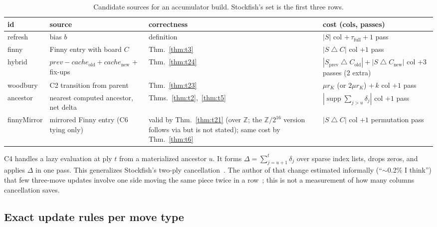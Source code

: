 \documentclass[10pt]{article}
\newcommand{\lnm}[1]{\lean{VNNUE.#1}}
\newcommand{\Z}{\mathbb{Z}}
\newcommand{\Zm}[1]{\Z/2^{#1}}
\DeclareMathOperator{\supp}{supp}
\newcommand{\symd}{\mathbin{\triangle}}
\theoremstyle{plain}
\theoremstyle{definition}
\begin{document}
\begin{table}[htbp]
\centering\small
\caption{Candidate sources for an accumulator build. Stockfish's set is the first three rows.}\label{tab:sources}
\begin{tabularx}{\linewidth}{@{}l>{\raggedright}X>{\raggedright}p{2.3cm}>{\raggedright\arraybackslash}X@{}}
\toprule
id & source & correctness & cost (cols, passes)\\
\midrule
refresh & bias $b$ & definition & $|S|$ col $+\,\tau_{\text{full}}+1$ pass\\
finny & Finny entry with board $C$ & Thm.~\ref{thm:t3} & $|S\symd C|$ col $+1$ pass\\
hybrid & $\mathit{prev}-\mathit{cache}_{\text{old}}+\mathit{cache}_{\text{new}}$ + fix-ups & Thm.~\ref{thm:t24} & $|S_{\text{prev}}\symd C_{\text{old}}|+|S\symd C_{\text{new}}|$ col $+3$ passes (2 extra)\\
woodbury & C2 transition from parent & Thm.~\ref{thm:t23} & $\mu r_K$ (or $2\mu r_K$) $+\,k$ col $+1$ pass\\
ancestor & nearest computed ancestor, net delta & Thms.~\ref{thm:t2},~\ref{thm:t5} & $|\supp\sum_{j>u}\delta_j|$ col $+1$ pass\\
finnyMirror & mirrored Finny entry (C6 tying only) & valid by Thm.~\ref{thm:t21} (over $\Z$; the $\Zm{16}$ version follows via \lnm{castLanes_accV} but is not stated); same cost by Thm.~\ref{thm:t6} & $|S\symd C|$ col $+1$ permutation pass\\
\bottomrule
\end{tabularx}
\end{table}

C4 handles a lazy evaluation at ply $t$ from a materialized ancestor $u$.
It forms $\Delta=\sum_{j=u+1}^t\delta_j$ over sparse index lists, drops zeros, and applies $\Delta$ in one pass.
This generalizes Stockfish's two-ply cancellation~\cite{sfpr5988}.
The author of that change estimated informally (``$\sim$0.2\% I think'') that few three-move updates involve one side moving the same piece twice in a row~\cite{sfpr5988}; this is not a measurement of how many columns cancellation saves.

\subsection{Exact update rules per move type}
\end{document}
